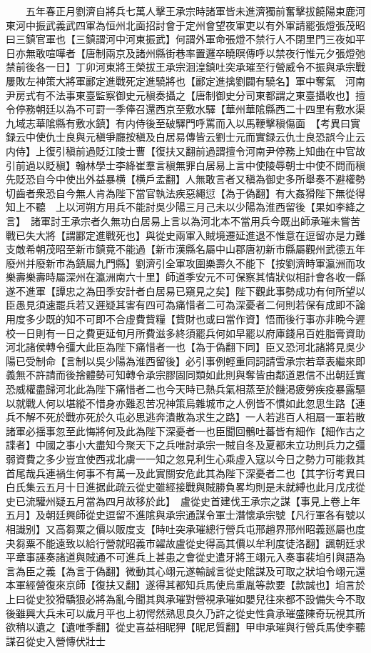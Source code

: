 　　五年春正月劉濟自將兵七萬人擊王承宗時諸軍皆未進濟獨前奮擊拔饒陽束鹿河東河中振武義武四軍為恒州北面招討會于定州會望夜軍吏以有外軍請罷張燈張茂昭曰三鎮官軍也【三鎮謂河中河東振武】何謂外軍命張燈不禁行人不閉里門三夜如平日亦無敢喧嘩者【唐制兩京及諸州縣街巷率置邏卒曉暝傳呼以禁夜行惟元夕張燈弛禁前後各一日】丁卯河東將王榮拔王承宗洄湟鎮吐突承璀至行營威令不振與承宗戰屢敗左神策大將軍酈定進戰死定進驍將也【酈定進擒劉闢有驍名】軍中奪氣　河南尹房式有不法事東臺監察御史元稹奏攝之【唐制御史分司東都謂之東臺攝收也】擅令停務朝廷以為不可罸一季俸召還西京至敷水驛【華州華隂縣西二十四里有敷水渠九域志華隂縣有敷水鎮】有内侍後至破驛門呼罵而入以馬鞭擊稹傷面　【考異曰實録云中使仇士良與元稹爭廳按稹及白居易傳皆云劉士元而實録云仇士良恐誤今止云内侍】上復引稹前過貶江陵士曹【復扶又翻前過謂擅令河南尹停務上知曲在中官故引前過以貶稹】翰林學士李絳崔羣言稹無罪白居易上言中使陵辱朝士中使不問而稹先貶恐自今中使出外益暴横【横戶孟翻】人無敢言者又稹為御史多所舉奏不避權勢切齒者衆恐自今無人肯為陛下當官執法疾惡繩愆【為于偽翻】有大姦猾陛下無從得知上不聽　上以河朔方用兵不能討吳少陽三月己未以少陽為淮西留後【果如李絳之言】　諸軍討王承宗者久無功白居易上言以為河北本不當用兵今既出師承璀未嘗苦戰已失大將【謂酈定進戰死也】與從史兩軍入賊境遷延進退不惟意在逗留亦是力難支敵希朝茂昭至新市鎮竟不能過【新市漢縣名屬中山郡唐初新市縣屬觀州武德五年廢州并廢新市為鎮屬九門縣】劉濟引全軍攻圍樂壽久不能下【按劉濟時軍瀛洲而攻樂壽樂壽時屬深州在瀛洲南六十里】師道季安元不可保察其情狀似相計會各收一縣遂不進軍【譚忠之為田季安計者白居易已窺見之矣】陛下觀此事勢成功有何所望以臣愚見須速罷兵若又遲疑其害有四可為痛惜者二可為深憂者二何則若保有成即不論用度多少既的知不可即不合虛費貲糧【貲財也或曰當作資】悟而後行事亦非晩今遲校一日則有一日之費更延旬月所費滋多終須罷兵何如早罷以府庫錢帛百姓脂膏資助河北諸侯轉令彊大此臣為陛下痛惜者一也【為于偽翻下同】臣又恐河北諸將見吳少陽已受制命【言制以吳少陽為淮西留後】必引事例輕重同詞請雪承宗若章表繼來即義無不許請而後捨體勢可知轉令承宗膠固同類如此則與奪皆由鄰道恩信不出朝廷實恐威權盡歸河北此為陛下痛惜者二也今天時已熱兵氣相蒸至於饑渇疲勞疾疫暴露驅以就戰人何以堪縱不惜身亦難忍苦况神策烏雜城市之人例皆不慣如此忽思生路【連兵不解不死於戰亦死於久屯必思逃奔潰散為求生之路】一人若逃百人相扇一軍若散諸軍必揺事忽至此悔將何及此為陛下深憂者一也臣聞回鶻吐蕃皆有細作【細作古之諜者】中國之事小大盡知今聚天下之兵唯討承宗一賊自冬及夏都未立功則兵力之彊弱資費之多少豈宜使西戎北虜一一知之忽見利生心乘虛入寇以今日之勢力可能救其首尾哉兵連禍生何事不有萬一及此實關安危此其為陛下深憂者二也【其字衍考異曰白氏集云五月十日進据此疏云從史雖經接戰與賊勝負畧均則是未就縛也此月戊戌從史已流驩州疑五月當為四月故移於此】　盧從史首建伐王承宗之謀【事見上卷上年五月】及朝廷興師從史逗留不進隂與承宗通謀令軍士潛懷承宗號【凡行軍各有號以相識别】又高芻粟之價以販度支【時吐突承璀總行營兵屯邢趙界邢州昭義廵屬也度夬芻粟不能遠致以給行營就昭義市糴故盧從史得高其價以牟利度徒洛翻】諷朝廷求平章事誣奏諸道與賊通不可進兵上甚患之會從史遣牙將王翊元入奏事裴垍引與語為言為臣之義【為言于偽翻】微動其心翊元遂輸誠言從史隂謀及可取之狀垍令翊元還本軍經營復來京師【復扶又翻】遂得其都知兵馬使烏重胤等款要【款誠也】垍言於上曰從史狡猾驕狠必將為亂今聞其與承璀對營視承璀如嬰兒往來都不設備失今不取後雖興大兵未可以歲月平也上初愕然熟思良久乃許之從史性貪承璀盛陳奇玩視其所欲稍以遺之【遺唯季翻】從史喜益相昵狎【昵尼質翻】甲申承璀與行營兵馬使李聽謀召從史入營慱伏壯士